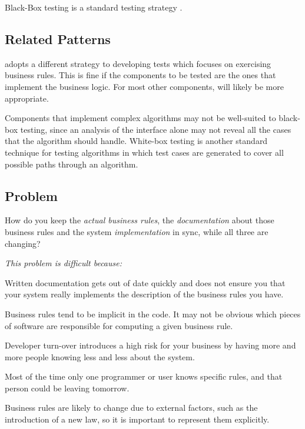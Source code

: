 \documentclass[a4paper,10pt,twoside]{book}
\begin{document}
Black-Box testing is a standard testing strategy \cite{Somm96a}.

\subsection*{Related Patterns}

 adopts a different strategy to developing tests which focuses on exercising business rules. This is fine if the components to be tested are the ones that implement the business logic. For most other components,  will likely be more appropriate.

Components that implement complex algorithms may not be well-suited to black-box testing, since an analysis of the interface alone may not reveal all the cases that the algorithm should handle. White-box testing \cite{Somm96a} is another standard technique for testing algorithms in which test cases are generated to cover all possible paths through an algorithm.




\subsection*{Problem}

How do you keep the \emph{actual business rules}, the \emph{documentation} about those business rules and the system \emph{implementation} in sync, while all three are changing?

\emph{This problem is difficult because:}

\begin{bulletlist}
\item Written documentation gets out of date quickly and does not ensure you that your system really implements the description of the business rules you have.
\item Business rules tend to be implicit in the code. It may not be obvious which pieces of software are responsible for computing a given business rule.
\item Developer turn-over introduces a high risk for your business by having more and more people knowing less and less about the system.
\item Most of the time only one programmer or user knows specific rules, and that person could be leaving tomorrow.
\item Business rules are likely to change due to external factors, such as the introduction of a new law, so it is important to represent them explicitly.
\end{bulletlist}
\end{document}
